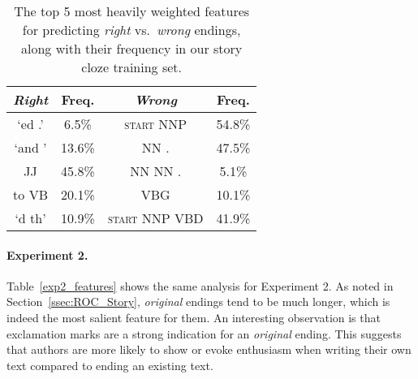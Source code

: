\documentclass[11pt,a4paper]{article}
\newcommand{\secref}[1]{Section~\ref{ssec:#1}}
\newcommand{\tabref}[1]{Table~\ref{#1}}
\begin{document}
{\begin{table}[!t]
\begin{center}
\begin{tabular}{|c|c||c|c|} \hline
\textit{\textbf{Right}} & Freq. & \textit{\textbf{Wrong}}& Freq. \\ \hline
`ed .' & {\color{white}{0}}6.5\%& \textsc{start} NNP & 54.8\%\\ \hline
`and ' & 13.6\%& NN . & 47.5\% \\ \hline
JJ & 45.8\% & NN NN . & {\color{white}{0}}5.1\%\\ \hline
to VB & 20.1\%& VBG & 10.1\%\\ \hline
`d th' & 10.9\%& \textsc{start} NNP VBD & 41.9\%\\ \hline

\end{tabular}
\end{center}
\caption{\label{exp1_features}
The top 5 most heavily weighted features for predicting {\it right} vs.~{\it wrong} endings,
along with their frequency in our story cloze training set.
}
\end{table}



\paragraph{Experiment 2.}
\tabref{exp2_features} shows the same analysis for Experiment 2.
As noted in \secref{ROC_Story}, {\it original} endings tend to be much longer, which is indeed the most salient feature for them.
An interesting observation is that exclamation marks are a strong
indication for an  {\it original} ending. 
This suggests that authors are more likely to show or evoke enthusiasm when writing their own text compared to ending an existing text.

}
\end{document}
